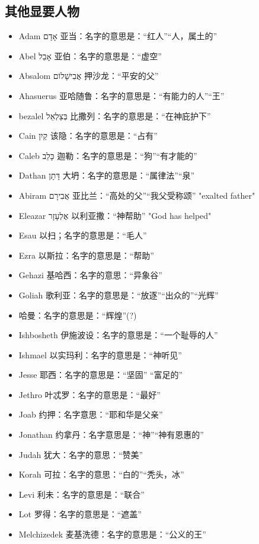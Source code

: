 \subsection{其他显要人物}
\begin{itemize}
\itemsep-.45em
\item Adam אָדָם 亚当：名字的意思是：“红人”“人，属土的”
\item Abel אָבֵל 亚伯：名字的意思是：“虚空”
\item Absalom אֲבִישָׁלוֹם 押沙龙：“平安的父”
\item Ahasuerus  亚哈随鲁：名字的意思是：“有能力的人”“王”
\item bezalel בְּצַלְאֵל 比撒列：名字的意思是：“在神庇护下”
　　\item Cain קַיִן 该隐：名字的意思是：“占有”
　　\item Caleb כָּלֵב 迦勒：名字的意思是：“狗”“有才能的”
　　\item Dathan דָּתָן 大坍：名字的意思是：“属律法”“泉”
　　\item Abiram אֲבִירָם 亚比兰：“高处的父”“我父受称颂” "exalted father"
　　\item Eleazar אֶלְעָזָר 以利亚撒：“神帮助” "God has helped"
　　\item Esau  以扫；名字的意思是：“毛人”
　　\item Ezra  以斯拉：名字的意思是：“帮助”
　　\item Gehazi  基哈西：名字的意思：“异象谷”
　　\item Goliah  歌利亚：名字的意思是：“放逐”“出众的”“光辉”
　　\item 哈曼：名字的意思是：“辉煌”(?)
　　\item Ishbosheth  伊施波设：名字的意思是：“一个耻辱的人”
　　\item Ishmael  以实玛利：名字的意思是：“神听见”
　　\item Jesse  耶西：名字的意思是：“坚固” “富足的”
　　\item Jethro  叶忒罗：名字的意思是：“最好”
　　\item Joab  约押：名字意思：“耶和华是父亲”
　　\item Jonathan  约拿丹：名字意思是：“神”“神有恩惠的”
　　\item Judah  犹大：名字的意思：“赞美”
　　\item Korah  可拉：名字的意思：“白的”“秃头，冰”
　　\item Levi  利未：名字的意思是：“联合”
　　\item Lot  罗得：名字的意思是：“遮盖”
　　\item Melchizedek  麦基洗德：名字的意思是：“公义的王”

\end{itemize}
